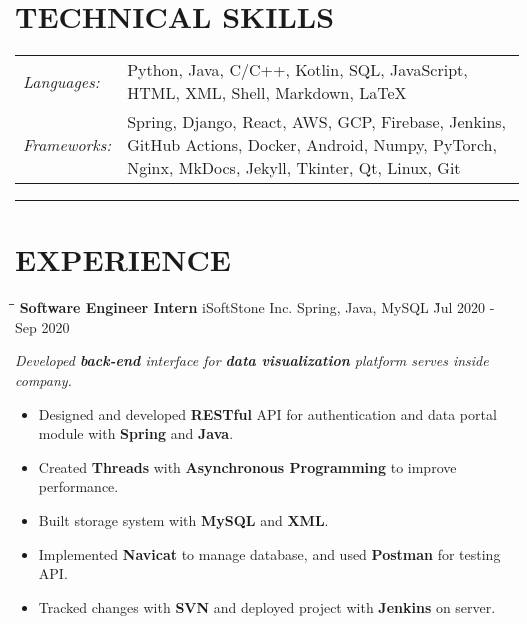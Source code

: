 \documentclass{res}
\begin{document}
\begin{resume}
\vspace{-0.2in}
\section{TECHNICAL SKILLS}  
    \vspace{+0.1in}
    \hspace{-0.12in} 
    \begin{tabular}{l p{5.5in}}
    \rule{0in}{0.2in}
    {\sl Languages:} & Python, Java, C/C++, Kotlin, SQL, JavaScript, HTML, XML,  
                        Shell, Markdown, LaTeX \\ 
    \rule{0in}{0.2in}
    {\sl Frameworks:} & Spring, Django, React, AWS, GCP, Firebase, Jenkins, GitHub Actions, Docker, 
                        Android, Numpy, PyTorch, Nginx, MkDocs, Jekyll, Tkinter, Qt, Linux, Git
    \end{tabular}   

\vspace{-5pt}
\hspace{-0.55in}
\noindent\rule[0.25\baselineskip]{19.36cm}{0.5pt}    

\vspace{-0.2in}
\section{EXPERIENCE}
    \vspace{0.00in}	
    \begin{tabbing}
    \hspace{2.6in}\= \hspace{1.5in}\= \hspace{1.6in}\= \kill %
    {\bf Software Engineer Intern} \> iSoftStone Inc. \>  
                                        Spring, Java, MySQL    \` Jul 2020 - Sep 2020\\
    \end{tabbing}\vspace{-20pt}      %
    \vspace{-0.1in}
    \textit{Developed {\bf back-end} interface for {\bf data visualization} 
                platform serves inside company.}
    \vspace{+0.05in}
    \begin{itemize} \itemsep 1.5pt %
        \item Designed and developed {\bf RESTful} API for authentication and 
                data portal module with {\bf Spring} and {\bf Java}.
        \item Created {\bf Threads} with {\bf Asynchronous Programming} to 
                improve performance.
        \item Built storage system with {\bf MySQL} and {\bf XML}.
        \item Implemented {\bf Navicat} to manage database, and used {\bf Postman} for testing API.
        \item Tracked changes with {\bf SVN} and deployed project with {\bf Jenkins} 
                on server.
    \end{itemize}


\end{resume}
\end{document}
